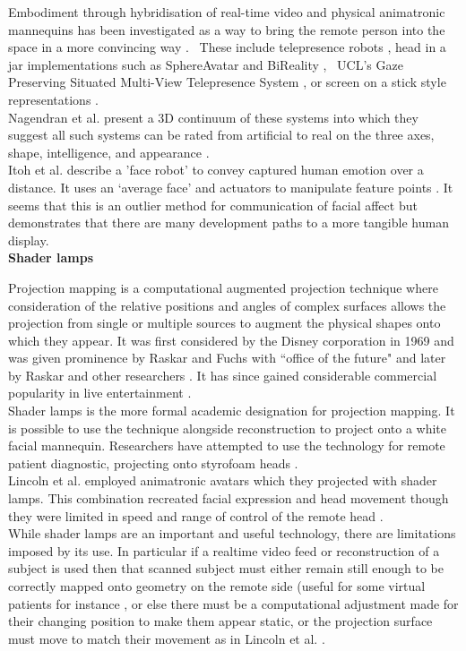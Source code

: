                     Embodiment through hybridisation of real-time video and physical animatronic mannequins has been investigated as a way to bring the remote person into the space in a more convincing way \cite{Lincoln2009, Lincoln:2010it, Raskar2001a}. \ These include telepresence robots \cite{Lee2011b, Sakamoto2007, Tsui2011}, head in a jar implementations such as SphereAvatar \cite{Oyekoya2012, pan2014comparing, Pan2012a} and BiReality \cite{Jouppi2004}, \ UCL's Gaze Preserving Situated Multi-View Telepresence System \cite{Pan2014a}, or screen on a stick style representations \cite{Kristoffersson2013}.\\  
                    Nagendran et al. present a 3D continuum of these systems into which they suggest all such systems can be rated from artificial to real on the three axes, shape, intelligence, and appearance \cite{Nagendran}.\\
                    Itoh et al. describe a 'face robot' to convey captured human emotion over a distance. It uses an `average face' and actuators to manipulate feature points \cite{Itoh2005}. It seems that this is an outlier method for communication of facial affect but demonstrates that there are many development paths to a more tangible human display.\\ 
\textbf{Shader lamps}

Projection mapping is a computational augmented projection technique where consideration of the relative positions and angles of complex surfaces allows the projection from single or multiple sources to augment the physical shapes onto which they appear. It was first considered by the Disney corporation in 1969 \cite{projectionmappingweb2013} and was given prominence by Raskar and Fuchs with ``office of the future" \cite{Raskar1998} and later by Raskar and other researchers \cite{Low2001, Raskar2001a}. It has since gained considerable commercial popularity in live entertainment \cite{googleStatsProjectionMapping}.\\
                    Shader lamps \cite{Raskar2001a} is the more formal academic designation for projection mapping. It is possible to use the technique alongside reconstruction to project onto a white facial mannequin. Researchers have attempted to use the technology for remote patient diagnostic, projecting onto styrofoam heads  \cite{Rivera-Gutierrez2012}.\\          
                    Lincoln et al. employed animatronic avatars which they projected with shader lamps. This combination recreated facial expression and head movement though they were limited in speed and range of control of the remote head \cite{Lincoln:2010it}.\\
                    While shader lamps are an important and useful technology, there are limitations imposed by its use. In particular if a realtime video feed or reconstruction of a subject is used then that scanned subject must either remain still enough to be correctly mapped onto geometry on the remote side (useful for some virtual patients for instance \cite{Benjamin2012}, or else there must be a computational adjustment made for their changing position to make them appear static, or the projection surface must move to match their movement as in Lincoln et al. .
 
